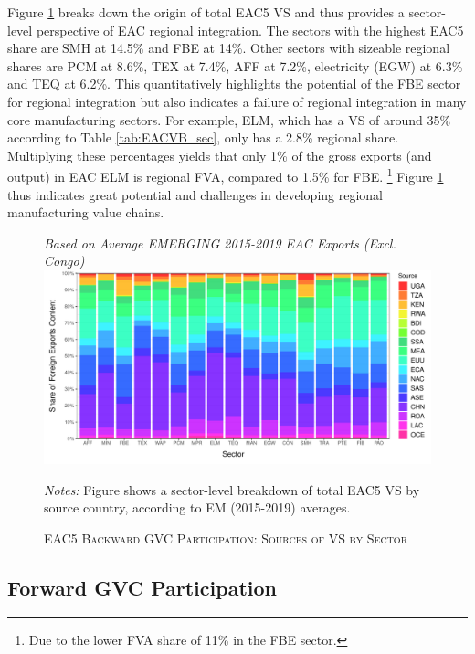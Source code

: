 \documentclass[a4paper]{article}
\begin{document}
 Figure \ref{fig:EACVB_ctry_sec} breaks down the origin of total EAC5 VS and thus provides a sector-level perspective of EAC regional integration. The sectors with the highest EAC5 share are SMH at 14.5\% and FBE at 14\%. Other sectors with sizeable regional shares are PCM at 8.6\%, TEX at 7.4\%, AFF at 7.2\%, electricity (EGW) at 6.3\% and TEQ at 6.2\%. This quantitatively highlights the potential of the FBE sector for regional integration but also indicates a failure of regional integration in many core manufacturing sectors. For example, ELM, which has a VS of around 35\% according to Table \ref{tab:EACVB_sec}, only has a 2.8\% regional share. Multiplying these percentages yields that only 1\% of the gross exports (and output) in EAC ELM is regional FVA, compared to 1.5\% for FBE. \footnote{Due to the lower FVA share of 11\% in the FBE sector. \vspace{-3mm}} Figure \ref{fig:EACVB_ctry_sec} thus indicates great potential and challenges in developing regional manufacturing value chains. 

\begin{figure}[h!] 
\centering
\caption{\label{fig:EACVB_ctry_sec}\textsc{EAC5 Backward GVC Participation: Sources of VS by Sector}}
\small{\textit{Based on Average EMERGING 2015-2019 EAC Exports (Excl. Congo)}}
\vspace{2mm}
\includegraphics[width=1\textwidth, trim= {0 0 0 0}, clip]{"VA_shares_sec_ctry.pdf"} \\ 
\raggedright
\scriptsize
\vspace{-3mm}
\emph{Notes:} Figure shows a sector-level breakdown of total EAC5 VS by source country, according to EM (2015-2019) averages. 
\end{figure}
\FloatBarrier 




\subsection{Forward GVC Participation}
\end{document}
